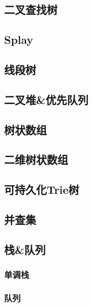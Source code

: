 \documentclass{ctexart}
\begin{document}
\subsection{二叉查找树}

\subsection{Splay}


\subsection{线段树}

\subsection{二叉堆\&优先队列}

\subsection{树状数组} %

\subsection{二维树状数组} %

\subsection{可持久化Trie树} %

\subsection{并查集} %

\subsection{栈\&队列}
\subsubsection{单调栈}

\subsubsection{队列}

\end{document}
